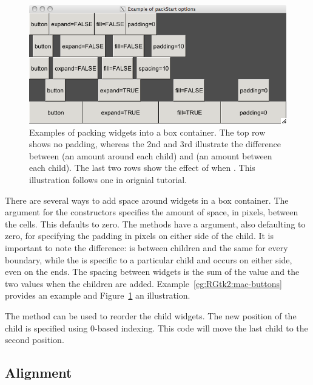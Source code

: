 \begin{figure}
  \centering
  \includegraphics[width=.85\textwidth]{ex-RGtk2-pack-start}
  \caption{Examples of packing widgets into a box container. The top
    row shows no padding, whereas the 2nd and 3rd illustrate the
    difference between  (an amount around each child)
    and  (an amount between each child). The last two
    rows show the effect of  when . This
    illustration follows one in orignial \GTK\/ tutorial.}
  \label{fig:RGtk2-pack-start}
\end{figure}

There are several ways to add space around widgets in a box container.
The  argument for the constructors
specifies the amount of space, in pixels, between the cells. This
defaults to zero. The  methods have a
 argument, also defaulting to zero,
for specifying the padding in pixels on either side of the child. It
is important to note the difference:  is between
children and the same for every boundary, while the  is
specific to a particular child and occurs on either side, even on the
ends. The spacing between widgets is the sum of the 
value and the two  values when the children are added.
Example~\ref{eg:RGtk2:mac-buttons} provides an example and
Figure~\ref{fig:RGtk2-pack-start} an illustration.

The  method can be used
to reorder the child widgets. The new position of the child is
specified using 0-based indexing. This code will move the last child
to the second position.
\begin{Schunk}
\end{Schunk}

\subsection{Alignment}
\label{sec:RGtk2:layout:align}

